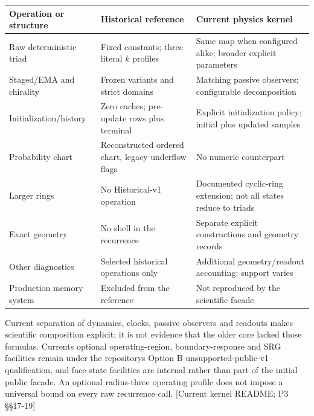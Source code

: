 \documentclass[
  11pt,
  a4paper,
]{article}
\newcounter{none} %
\begin{document}
{\def\LTcaptype{none} %
\begin{longtable}[]{@{}
  >{\raggedright\arraybackslash}p{}
  >{\raggedright\arraybackslash}p{}
  >{\raggedright\arraybackslash}p{}@{}}
\toprule\noalign{}
\begin{minipage}[b]{\linewidth}\raggedright
Operation or structure
\end{minipage} & \begin{minipage}[b]{\linewidth}\raggedright
Historical reference
\end{minipage} & \begin{minipage}[b]{\linewidth}\raggedright
Current physics kernel
\end{minipage} \\
\midrule\noalign{}
\endhead
\bottomrule\noalign{}
\endlastfoot
Raw deterministic triad & Fixed constants; three literal \(k\) profiles & Same map when configured alike; broader explicit parameters \\
Staged/EMA and chirality & Frozen variants and strict domains & Matching passive observers; configurable decomposition \\
Initialization/history & Zero caches; pre-update rows plus terminal & Explicit initialization policy; initial plus updated samples \\
Probability chart & Reconstructed ordered chart, legacy underflow flags & No numeric counterpart \\
Larger rings & No Historical-v1 operation & Documented cyclic-ring extension; not all states reduce to triads \\
Exact geometry & No shell in the recurrence & Separate explicit constructions and geometry records \\
Other diagnostics & Selected historical operations only & Additional geometry/readout accounting; support varies \\
Production memory system & Excluded from the reference & Not reproduced by the scientific facade \\
\end{longtable}
}

Current separation of dynamics, clocks, passive observers and readouts makes scientific composition explicit; it is not evidence that the older core lacked those formulas. Current\textquotesingle s optional operating-region, boundary-response and SRG facilities remain under the repository\textquotesingle s Option B unsupported-public-v1 qualification, and face-state facilities are internal rather than part of the initial public facade. An optional radius-three operating profile does not impose a universal bound on every raw recurrence call. {[}Current kernel README; P3 §§17-19{]}
\end{document}
